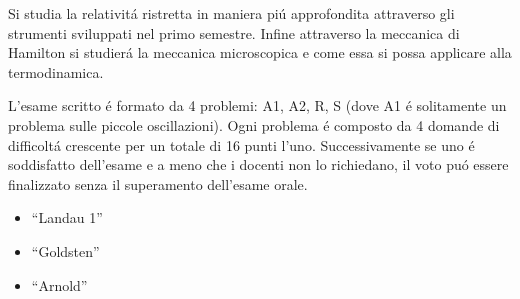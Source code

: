 \begin{multicols}{3}
  Si studia la relativit\'a ristretta in maniera pi\'u approfondita attraverso
  gli strumenti sviluppati nel primo semestre. Infine attraverso la meccanica
  di Hamilton si studier\'a la meccanica microscopica e come essa si possa
  applicare alla termodinamica.

  L'esame scritto \'e formato da 4 problemi: A1, A2, R, S (dove A1 \'e
  solitamente un problema sulle piccole oscillazioni). Ogni problema \'e
  composto da 4 domande di difficolt\'a crescente per un totale di 16 punti
  l'uno. Successivamente se uno \'e soddisfatto dell'esame e a meno che i
  docenti non lo richiedano, il voto pu\'o essere finalizzato senza il
  superamento dell'esame orale.

  \begin{itemize}
  \item ``Landau 1''
  \item ``Goldsten''
  \item ``Arnold''
  \end{itemize}

\end{multicols}


